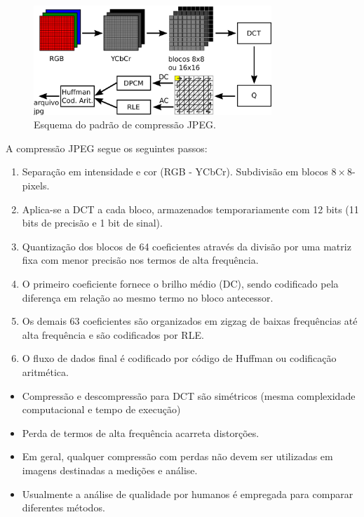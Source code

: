 \begin{frame}[allowframebreaks]
  \framebreak
 
  \begin{figure}[h!]
  \centering
  \includegraphics[width=0.8\textwidth]{images/jpegstd.pdf}
  \caption{Esquema do padrão de compressão JPEG.}
  \label{fig:jpegschema}
  \end{figure}

  \framebreak

  A compressão JPEG segue os seguintes passos:
  \begin{enumerate}
  \item Separação em intensidade e cor (RGB - YCbCr). Subdivisão em blocos $8 \times 8$-pixels.
  \item Aplica-se a DCT a cada bloco, armazenados temporariamente com 12 bits (11 bits de precisão e 1 bit de sinal).
  \item Quantização dos blocos de 64 coeficientes através da divisão por uma matriz fixa com
        menor precisão nos termos de alta frequência.
  \item O primeiro coeficiente fornece o brilho médio (DC), sendo codificado pela diferença em relação
        ao mesmo termo no bloco antecessor. 
  \item Os demais 63 coeficientes são organizados em zigzag de baixas frequências até alta frequência
        e são codificados por RLE.
  \item O fluxo de dados final é codificado por código de Huffman ou codificação aritmética.
  \end{enumerate}


  \framebreak

  \begin{itemize}
  \item Compressão e descompressão para DCT são simétricos (mesma complexidade computacional e tempo de execução)
  \item Perda de termos de alta frequência acarreta distorções.
  \item Em geral, qualquer compressão com perdas não devem ser utilizadas em imagens destinadas a medições e análise.
  \item Usualmente a análise de qualidade por humanos é empregada para comparar diferentes métodos.
  \end{itemize}


\end{frame}
